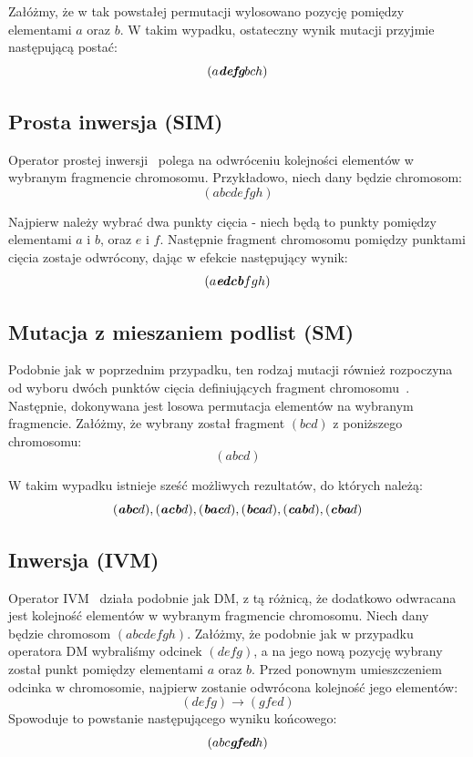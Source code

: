 \documentclass{xmgr}
\begin{document}
Załóżmy, że w tak powstałej permutacji wylosowano pozycję pomiędzy elementami $a$ oraz $b$. W takim wypadku, ostateczny wynik mutacji przyjmie następującą postać:
$$ (a \textit{\textbf{defg}} b c h) $$

\subsection{Prosta inwersja (SIM)}

Operator prostej inwersji~\cite{Holland1975} polega na odwróceniu kolejności elementów w wybranym fragmencie chromosomu. Przykładowo, niech dany będzie chromosom:
$$ (a b c d e f g h) $$

Najpierw należy wybrać dwa punkty cięcia - niech będą to punkty pomiędzy elementami $a$ i $b$, oraz $e$ i $f$. Następnie fragment chromosomu pomiędzy punktami cięcia zostaje odwrócony, dając w efekcie następujący wynik:
$$ (a \textit{\textbf{edcb}} f g h) $$

\subsection{Mutacja z mieszaniem podlist (SM)}

Podobnie jak w poprzednim przypadku, ten rodzaj mutacji również rozpoczyna od wyboru dwóch punktów cięcia definiujących fragment chromosomu~\cite{Syswerda}. Następnie, dokonywana jest losowa permutacja elementów na wybranym fragmencie. Załóżmy, że wybrany został fragment $(b c d)$ z poniższego chromosomu:
$$ (a b c d) $$

W takim wypadku istnieje sześć możliwych rezultatów, do których należą:
$$(\textit{\textbf{abc}} d), (\textit{\textbf{acb}} d), (\textit{\textbf{bac}} d), (\textit{\textbf{bca}} d), (\textit{\textbf{cab}} d), (\textit{\textbf{cba}} d) $$

\subsection{Inwersja (IVM)}

Operator IVM~\cite{Fogel1993} działa podobnie jak DM, z tą różnicą, że dodatkowo odwracana jest kolejność elementów w wybranym fragmencie chromosomu. Niech dany będzie chromosom $ (a b c d e f g h) $. Załóżmy, że podobnie jak w przypadku operatora DM wybraliśmy odcinek $ (d e f g) $, a na jego nową pozycję wybrany został punkt pomiędzy elementami $a$ oraz $b$. Przed ponownym umieszczeniem odcinka w chromosomie, najpierw zostanie odwrócona kolejność jego elementów:
$$ (d e f g) \rightarrow (g f e d) $$
Spowoduje to powstanie następującego wyniku końcowego:
$$ (a b c \textit{\textbf{gfed}} h) $$
\end{document}
